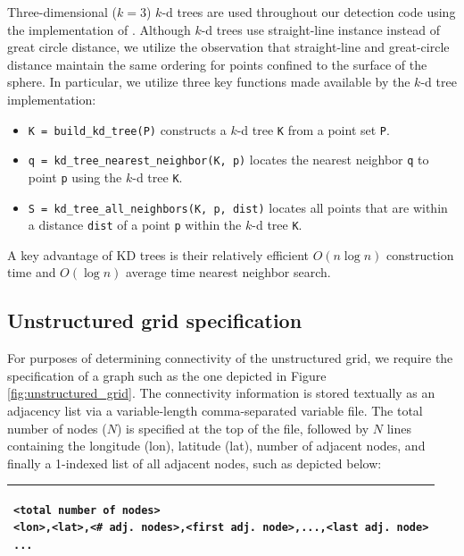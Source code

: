 \documentclass[gmdd, hvmath, online]{copernicus_discussions}
\begin{document}
Three-dimensional ($k=3$) $k$-d trees \citep{bentley1975multidimensional} are used throughout our detection code using the implementation of \cite{tsiombikas2015kdtree}.  Although $k$-d trees use straight-line instance instead of great circle distance, we utilize the observation that straight-line and great-circle distance maintain the same ordering for points confined to the surface of the sphere.  In particular, we utilize three key functions made available by the $k$-d tree implementation:
\begin{itemize}
\item[] \texttt{K = build\_kd\_tree(P)} constructs a $k$-d tree \texttt{K} from a point set \texttt{P}.
\item[] \texttt{q = kd\_tree\_nearest\_neighbor(K, p)} locates the nearest neighbor \texttt{q} to point \texttt{p} using the $k$-d tree \texttt{K}.
\item[] \texttt{S = kd\_tree\_all\_neighbors(K, p, dist)} locates all points that are within a distance \texttt{dist} of a point \texttt{p} within the $k$-d tree \texttt{K}.
\end{itemize}

\noindent A key advantage of KD trees is their relatively efficient $O(n \log n)$ construction time and $O(\log n)$ average time nearest neighbor search.

\subsection{Unstructured grid specification}

For purposes of determining connectivity of the unstructured grid, we require the specification of a graph such as the one depicted in Figure \ref{fig:unstructured_grid}.  The connectivity information is stored textually as an adjacency list via a variable-length comma-separated variable file.  The total number of nodes ($N$) is specified at the top of the file, followed by $N$ lines containing the longitude (lon), latitude (lat), number of adjacent nodes, and finally a 1-indexed list of all adjacent nodes, such as depicted below:
\ \\

\noindent \begin{tabular}{|p{\textwidth}|}
\hline \small \begin{verbatim}
<total number of nodes>
<lon>,<lat>,<# adj. nodes>,<first adj. node>,...,<last adj. node>
...
\end{verbatim} \\
\hline
\end{tabular}
\end{document}
